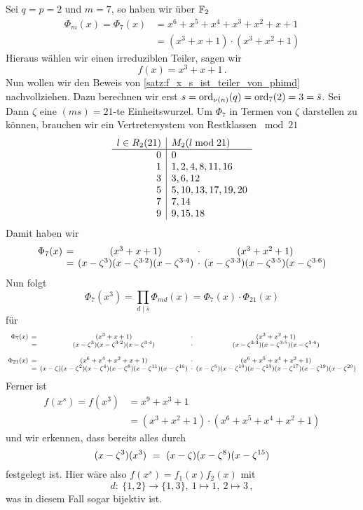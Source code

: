\begin{beispiel}
  Sei $q = p = 2$ und $m = 7$, so haben wir über $\mathbb{F}_2$
  \begin{align*}
    \Phi_m(x) = \Phi_7(x) &= 
      x^{6} + x^{5} + x^{4} + x^{3} + x^{2} + x + 1 \\
    &= (x^{3} + x + 1) \cdot (x^{3} + x^{2} + 1)
  \end{align*}
  Hieraus wählen wir einen irreduziblen Teiler, sagen wir
  \[ f(x) = x^3 + x +1\,.\]
  Nun wollen wir den Beweis von \cref{satz:f_x_s_ist_teiler_von_phimd}
  nachvollziehen. Dazu berechnen wir erst $s = \operatorname{ord}_{\nu(n)}(q) = 
  \operatorname{ord}_7(2) = 3  = \bar s$. Sei Dann $\zeta$ eine 
  $(ms) = 21$-te Einheitswurzel. Um $\Phi_7$ in Termen von $\zeta$ darstellen
  zu können, brauchen wir ein Vertretersystem von Restklassen ${}\bmod 21$
  \[\begin{array}[t]{r|l}
    l \in R_2(21) & M_2(l \bmod 21) \\\hline
    0 & 0 \\
    1 & 1, 2, 4, 8, 11, 16 \\
    3 & 3, 6, 12 \\
    5 & 5, 10, 13, 17, 19, 20 \\
    7 & 7, 14 \\
    9 & 9, 15, 18
  \end{array}\]
  Damit haben wir 
  \[ \setlength{\arraycolsep}{2pt}\begin{array}{rcccc}
    \Phi_7(x) &=& (x^{3} + x + 1) &\cdot& (x^{3} + x^{2} + 1) \\
      &=& (x-\zeta^3)(x-\zeta^{3\cdot 2})(x-\zeta^{3\cdot 4}) &\cdot&
        (x-\zeta^{3\cdot 3})(x-\zeta^{3\cdot 5})(x-\zeta^{3\cdot 6})
  \end{array}\]
  Nun folgt 
  \[\Phi_7(x^3) 
        = \prod_{d \mid \bar s} \Phi_{md}(x) = \Phi_7(x) \cdot \Phi_{21}(x)\]
  für 
  \[\footnotesize\setlength{\arraycolsep}{2pt}\everymath{\displaystyle}
    \begin{array}{rcccc} 
      \Phi_7(x)&=& (x^{3} + x + 1) &\cdot& (x^{3} + x^{2} + 1) \\
      &=& (x-\zeta^3)(x-\zeta^{3\cdot 2})(x-\zeta^{3\cdot 4}) &\cdot&
        (x-\zeta^{3\cdot 3})(x-\zeta^{3\cdot 5})(x-\zeta^{3\cdot 6}) \\[10pt]
      \Phi_{21}(x) &=& (x^{6} + x^{4} + x^{2} + x + 1) 
        &\cdot& (x^{6} + x^{5} + x^{4} + x^{2} + 1) \\
      &=& (x-\zeta)(x-\zeta^2)(x-\zeta^4)(x-\zeta^8)(x-\zeta^{11})
        (x-\zeta^{16}) &\cdot&
        (x-\zeta^5)(x-\zeta^{10})(x-\zeta^{13})(x-\zeta^{17})
        (x-\zeta^{19})(x-\zeta^{20}) 
    \end{array}\]
  Ferner ist 
  \begin{align*}
    f(x^s) = f(x^3) &= x^{9} + x^{3} + 1\\
    &= (x^{3} + x^{2} + 1) \cdot (x^{6} + x^{5} + x^{4} + x^{2} + 1)
  \end{align*}
  und wir erkennen, dass bereits alles durch
  \[ (x-\zeta^3)(x^3) \ =\  (x-\zeta) (x-\zeta^8) (x-\zeta^{15})\]
  festgelegt ist.
  Hier wäre also $f(x^s) = f_1(x)f_2(x)$ mit 
  \[ d:\ \{1,2\} \to \{1,3\},\ 1\mapsto 1,\ 2\mapsto 3\,,\]
  was in diesem Fall sogar bijektiv ist.
\end{beispiel}

